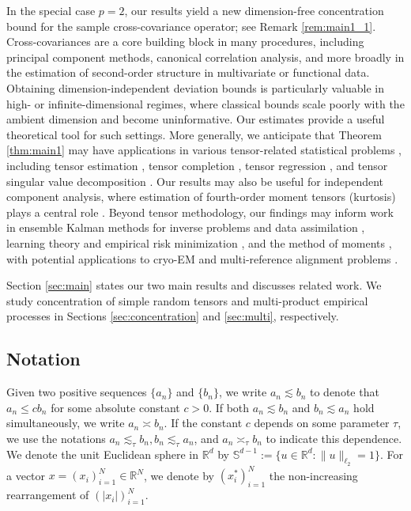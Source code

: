 \documentclass[numbers,webpdf,imaiai]{ima-authoring-template}
\theoremstyle{thmstyletwo}%
\numberwithin{equation}{section}
\numberwithin{equation}{section}
\providecommand{\mathbbm}{\mathbb} %
\newcommand{\R}{\mathbbm{R}}
\renewcommand{\S}{\mathbb{S}}
\begin{document}
In the special case $p=2$, our results yield a new dimension-free concentration bound for the sample cross-covariance operator; see Remark \ref{rem:main1_1}. Cross-covariances are a core building block in many procedures, including principal component methods, canonical correlation analysis, and more broadly in the estimation of second-order structure in multivariate or functional data. Obtaining dimension-independent deviation bounds is particularly valuable in high- or infinite-dimensional regimes, where classical bounds scale poorly with the ambient dimension and become uninformative. Our estimates provide a useful theoretical tool for such settings. More generally, we anticipate that Theorem \ref{thm:main1} may have applications in various tensor-related statistical problems \cite{mccullagh2018tensor,bi2021tensors,auddy2024tensors}, including tensor estimation \cite{han2022optimal,diakonikolas2024implicit}, tensor completion \cite{yuan2016tensor,xia2021statistically}, tensor regression \cite{luo2024tensor}, and tensor singular value decomposition \cite{zhang2018tensor,zhang2019optimal}.  Our results may also be useful for independent component analysis, where estimation of fourth-order moment tensors (kurtosis) plays a central role \cite{auddy2023large}. Beyond tensor methodology, our findings may inform work in ensemble Kalman methods for inverse problems and data assimilation \cite{sanzstuarttaeb,bach2024machine,chada2021iterative}, learning theory and empirical risk minimization \cite{even2021concentration}, and the method of moments \cite{sherman2020estimating}, with potential applications to cryo-EM and multi-reference alignment problems \cite{perry2019sample,bandeira2020optimal,dou2024rates}.


Section \ref{sec:main} states  our two main results and discusses related work. We study concentration of simple random tensors and multi-product empirical processes in Sections \ref{sec:concentration} and \ref{sec:multi}, respectively.

\subsection{Notation}
Given two positive sequences $\{a_n\}$ and $\{b_n\}$, we write $a_n\lesssim b_n$ to denote that $a_n \le c b_n$ for some absolute constant $c>0$. If both $a_n \lesssim b_n$ and $b_n \lesssim a_n$ hold simultaneously, we write $a_n \asymp b_n$. If the constant $c$ depends on some parameter $\tau$, we use the notations $a_n \lesssim_{\tau} b_n,b_n\lesssim_{\tau} a_n$, and $a_n\asymp_{\tau} b_n$ to indicate this dependence. We denote the unit Euclidean sphere in $\R^d$ by $\S^{d-1}:=\{u\in \R^d: \|u\|_{\ell_2}=1\}$. For a vector $x=(x_i)_{i=1}^{N}\in \R^{N}$, we denote by $\left(x_i^*\right)_{i=1}^N$  the non-increasing rearrangement of $\left(\left|x_i\right|\right)_{i=1}^N$. 
\end{document}
